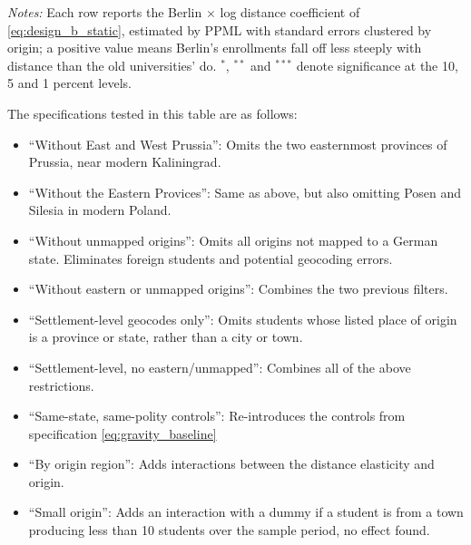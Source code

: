 \documentclass[11pt]{article}
\newcommand{\tabledir}{../output/tables}
\begin{document}
\begin{table}[htbp]
  \ttabbox
  {\caption{Re-estimates \eqref{eq:design_b_static} on restricted
   samples and with additional controls. The estimand in all specifications is
   $\kappa_{\text{Berlin}}$.}
   \label{tab:design_b_berlin_checks}}
  {\begin{threeparttable}
   
   \begin{tablenotes}[flushleft]\footnotesize
   \item \textit{Notes:} Each row reports the Berlin $\times$ log distance
   coefficient of \eqref{eq:design_b_static}, estimated by PPML with standard
   errors clustered by origin; a positive value means Berlin's enrollments fall
   off less steeply with distance than the old universities' do.
   $^{*}$, $^{**}$ and $^{***}$ denote significance at the 10, 5 and 1 percent
   levels.
   \item The specifications tested in this table are as follows:
   \begin{itemize}
        \item ``Without East and West Prussia'': Omits the two easternmost provinces of Prussia, near modern Kaliningrad.
        \item ``Without the Eastern Provices'': Same as above, but also omitting Posen and Silesia in modern Poland.
        \item ``Without unmapped origins'': Omits all origins not mapped to a German state. Eliminates foreign students and potential geocoding errors.
        \item ``Without eastern or unmapped origins'': Combines the two previous filters.
        \item ``Settlement-level geocodes only'': Omits students whose listed place of origin is a province or state, rather than a city or town.
        \item ``Settlement-level, no eastern/unmapped'': Combines all of the above restrictions.
        \item ``Same-state, same-polity controls'': Re-introduces the controls from specification \ref{eq:gravity_baseline}
        \item ``By origin region'': Adds interactions between the distance elasticity and origin.
        \item ``Small origin'': Adds an interaction with a dummy if a student is from a town producing less than 10 students over the sample period, no effect found.
   \end{itemize}
   \end{tablenotes}
   \end{threeparttable}}
\end{table}
\end{document}
